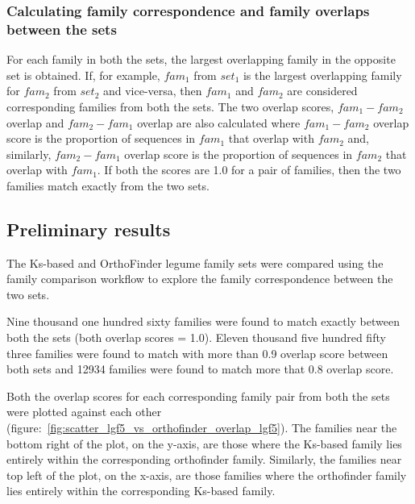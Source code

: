\documentclass{article}
\begin{document}
			\subsubsection{Calculating family correspondence and family overlaps between the sets}
			For each family in both the sets, the largest overlapping family in the opposite set  is obtained. If, for example, $fam_1$ from $set_1$ is the largest overlapping family for $fam_2$ from $set_2$ and vice-versa, then $fam_1$ and $fam_2$ are considered corresponding families from both the sets. The two overlap scores, $fam_1-fam_2$ overlap and $fam_2-fam_1$ overlap are also calculated where $fam_1-fam_2$ overlap score is the proportion of sequences in $fam_1$ that overlap with $fam_2$ and, similarly, $fam_2-fam_1$ overlap score is the proportion of sequences in $fam_2$ that overlap with $fam_1$. If both the scores are 1.0 for a pair of families, then the two families match exactly from the two sets.
			
		\subsection{Preliminary results}
		The Ks-based and OrthoFinder legume family sets were compared using the family comparison workflow to explore the family correspondence between the two sets.
		
		Nine thousand one hundred sixty families were found to match exactly between both the sets (both overlap scores = 1.0). Eleven thousand five hundred fifty three families were found to match with more than 0.9 overlap score between both sets and 12934 families were found to match more that 0.8 overlap score.
		
		Both the overlap scores for each corresponding family pair from both the sets were plotted against each other (figure:~\ref{fig:scatter_lgf5_vs_orthofinder_overlap_lgf5}). The families near the bottom right of the plot, on the y-axis, are those where the Ks-based family lies entirely within the corresponding orthofinder family. Similarly, the families near top left of the plot, on the x-axis,  are those families where the orthofinder family lies entirely within the corresponding Ks-based family.
		  
\end{document}
